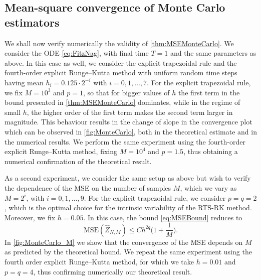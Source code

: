 \documentclass[10pt]{article}
\begin{document}
\subsection{Mean-square convergence of Monte Carlo estimators} 
We shall now verify numerically the validity of \cref{thm:MSEMonteCarlo}. We consider the ODE \eqref{eq:FitzNag}, with final time $T = 1$ and the same parameters as above. In this case as well, we consider the explicit trapezoidal rule and the fourth-order explicit Runge--Kutta method with uniform random time steps having mean $h_i = 0.125\cdot 2^{-i}$ with $i = 0, 1, \ldots, 7$. For the explicit trapezoidal rule, we fix $M = 10^3$ and $p = 1$, so that for bigger values of $h$ the first term in the bound presented in \cref{thm:MSEMonteCarlo} dominates, while in the regime of small $h$, the higher order of the first term makes the second term larger in magnitude. This behaviour results in the change of slope in the convergence plot which can be observed in \cref{fig:MonteCarlo}, both in the theoretical estimate and in the numerical results. We perform the same experiment using the fourth-order explicit Runge--Kutta method, fixing $M = 10^4$ and $p = 1.5$, thus obtaining a numerical confirmation of the theoretical result.

{As a second experiment, we consider the same setup as above but wish to verify the dependence of the MSE on the number of samples $M$, which we vary as $M = 2^i$, with $i = 0, 1, \ldots, 9$. For the explicit trapezoidal rule, we consider $p = q = 2$, which is the optimal choice for the intrinsic variability of the RTS-RK method. Moreover, we fix $h = 0.05$. In this case, the bound \eqref{eq:MSEBound} reduces to
\begin{equation}
	\mathrm{MSE}(\widehat Z_{N, M}) \leq Ch^{2q} \Big(1 + \frac{1}{M}\Big).
\end{equation}
In \cref{fig:MonteCarlo_M} we show that the convergence of the MSE depends on $M$ as predicted by the theoretical bound. We repeat the same experiment using the fourth order explicit Runge--Kutta method, for which we take $h = 0.01$ and $p = q = 4$, thus confirming numerically our theoretical result.}
\end{document}

